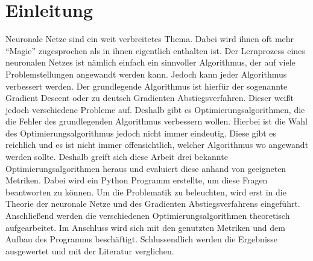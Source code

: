 \section{Einleitung}\label{einleitung}
Neuronale Netze sind ein weit verbreitetes Thema. Dabei wird ihnen oft mehr ``Magie''
zugesprochen als in ihnen eigentlich enthalten ist. Der Lernprozess eines neuronalen 
Netzes ist nämlich einfach ein sinnvoller Algorithmus, der auf viele Problemstellungen angewandt werden kann.
Jedoch kann jeder Algorithmus verbessert werden. Der grundlegende Algorithmus ist hierfür
der sogenannte Gradient Descent oder zu deutsch Gradienten Abstiegsverfahren. 
Dieser weißt jedoch verschiedene Probleme auf. Deshalb gibt es Optimierungsalgorithmen,
die die Fehler des grundlegenden Algorithmus verbessern wollen. Hierbei ist die Wahl 
des Optimierungsalgorithmus jedoch nicht immer eindeutig. Diese gibt es reichlich
und es ist nicht immer offensichtlich, welcher Algorithmus wo angewandt werden sollte.
Deshalb greift sich diese Arbeit drei bekannte Optimierungsalgorithmen heraus und 
evaluiert diese anhand von geeigneten Metriken. Dabei wird ein Python Programm erstellte, 
um diese Fragen beantworten zu können. Um die Problematik zu beleuchten, wird erst
in die Theorie der neuronale Netze und des Gradienten Abstiegsverfahrens eingeführt.
Anschließend werden die verschiedenen Optimierungsalgorithmen theoretisch aufgearbeitet.
Im Anschluss wird sich mit den genutzten Metriken und dem Aufbau des Programms beschäftigt.
Schlussendlich werden die Ergebnisse ausgewertet und mit der Literatur verglichen.    
